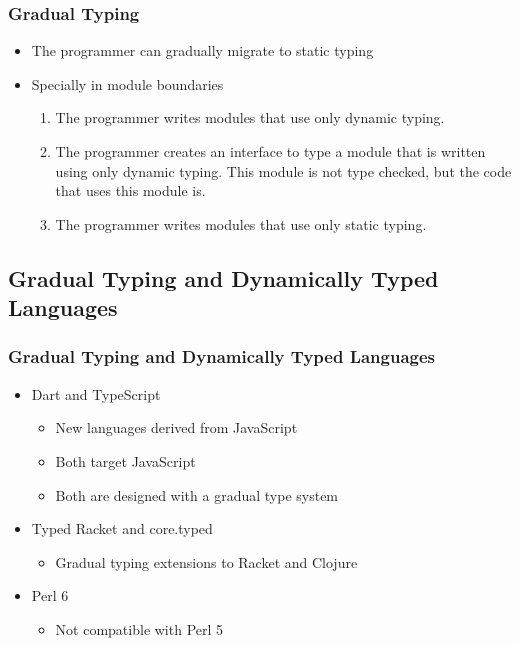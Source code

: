 \documentclass{beamer}
\begin{document}
\begin{frame}
\frametitle{Gradual Typing}
\begin{itemize}
\item The programmer can gradually migrate to static typing
\item Specially in module boundaries
\begin{enumerate}
\item The programmer writes modules that use only dynamic typing.
\item The programmer creates an interface to type a module that
is written using only dynamic typing. This module is not
type checked, but the code that uses this module is.
\item The programmer writes modules that use only static typing.
\end{enumerate}
\end{itemize}
\end{frame}

\subsection{Gradual Typing and Dynamically Typed Languages}
\begin{frame}
\frametitle{Gradual Typing and Dynamically Typed Languages}
\begin{itemize}
\item Dart and TypeScript
\begin{itemize}
\item New languages derived from JavaScript
\item Both target JavaScript
\item Both are designed with a gradual type system
\end{itemize}
\item Typed Racket and core.typed
\begin{itemize}
\item Gradual typing extensions to Racket and Clojure
\end{itemize}
\item Perl 6
\begin{itemize}
\item Not compatible with Perl 5
\end{itemize}
\end{itemize}
\end{frame}
\end{document}
